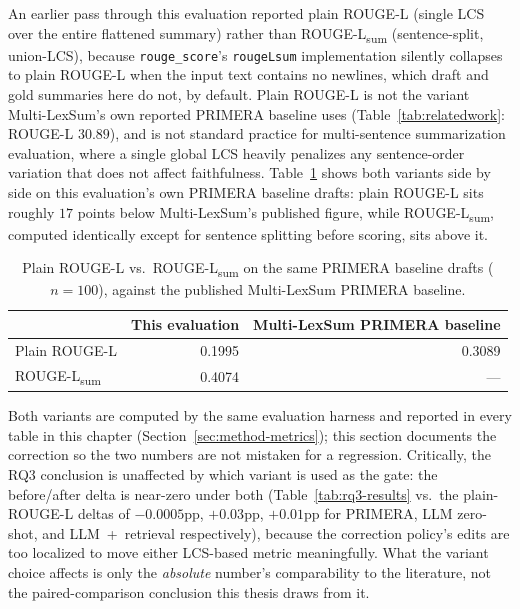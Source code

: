 An earlier pass through this evaluation reported plain ROUGE-L (single LCS over the entire flattened summary) rather than ROUGE-L\textsubscript{sum} (sentence-split, union-LCS), because \texttt{rouge\_score}'s \texttt{rougeLsum} implementation silently collapses to plain ROUGE-L when the input text contains no newlines, which draft and gold summaries here do not, by default. Plain ROUGE-L is not the variant Multi-LexSum's own reported PRIMERA baseline uses (Table~\ref{tab:relatedwork}: ROUGE-L $30.89$), and is not standard practice for multi-sentence summarization evaluation, where a single global LCS heavily penalizes any sentence-order variation that does not affect faithfulness. Table~\ref{tab:rougeL-variant-diff} shows both variants side by side on this evaluation's own PRIMERA baseline drafts: plain ROUGE-L sits roughly $17$ points below Multi-LexSum's published figure, while ROUGE-L\textsubscript{sum}, computed identically except for sentence splitting before scoring, sits above it.

\begin{table}[!t]
\centering
\caption{Plain ROUGE-L vs.\ ROUGE-L\textsubscript{sum} on the same PRIMERA baseline drafts ($n=100$), against the published Multi-LexSum PRIMERA baseline.}
\label{tab:rougeL-variant-diff}
\begin{tabular}{@{}lrr@{}}
\toprule
& \textbf{This evaluation} & \textbf{Multi-LexSum PRIMERA baseline} \\
\midrule
Plain ROUGE-L      & 0.1995 & 0.3089 \\
ROUGE-L\textsubscript{sum} & 0.4074 & --- \\
\bottomrule
\end{tabular}
\end{table}

Both variants are computed by the same evaluation harness and reported in every table in this chapter (Section~\ref{sec:method-metrics}); this section documents the correction so the two numbers are not mistaken for a regression. Critically, the RQ3 conclusion is unaffected by which variant is used as the gate: the before/after delta is near-zero under both (Table~\ref{tab:rq3-results} vs.\ the plain-ROUGE-L deltas of $-0.0005$pp, $+0.03$pp, $+0.01$pp for PRIMERA, LLM zero-shot, and LLM~+~retrieval respectively), because the correction policy's edits are too localized to move either LCS-based metric meaningfully. What the variant choice affects is only the \emph{absolute} number's comparability to the literature, not the paired-comparison conclusion this thesis draws from it.


